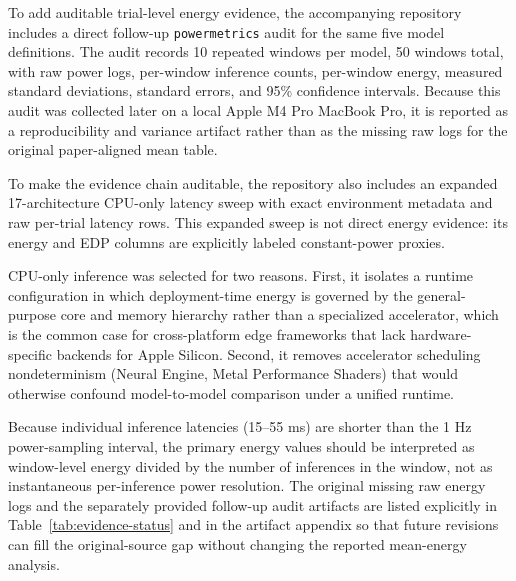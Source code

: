 \documentclass[conference]{IEEEtran}
\begin{document}
To add auditable trial-level energy evidence, the accompanying repository
includes a direct
follow-up \texttt{powermetrics} audit for the same five model definitions. The
audit records 10 repeated windows per model, 50 windows total, with raw power
logs, per-window inference counts, per-window energy, measured standard
deviations, standard errors, and 95\% confidence intervals. Because this audit
was collected later on a local Apple M4 Pro MacBook Pro, it is reported as a
reproducibility and variance artifact rather than as the missing raw logs for
the original paper-aligned mean table.

To make the evidence chain auditable, the repository also includes an expanded
17-architecture CPU-only latency sweep with exact environment metadata and raw
per-trial latency rows. This expanded sweep is not direct energy evidence:
its energy and EDP columns are explicitly labeled constant-power proxies.

CPU-only inference was selected for two reasons. First, it isolates a runtime
configuration in which deployment-time energy is governed by the general-purpose
core and memory hierarchy rather than a specialized accelerator, which is the
common case for cross-platform edge frameworks that lack hardware-specific
backends for Apple Silicon. Second, it removes accelerator scheduling
nondeterminism (Neural Engine, Metal Performance Shaders) that would otherwise
confound model-to-model comparison under a unified runtime.

Because individual inference latencies (15--55 ms) are shorter than the 1 Hz
power-sampling interval, the primary energy values should be interpreted as
window-level energy divided by the number of inferences in the window, not as
instantaneous per-inference power resolution. The original missing raw energy
logs and the separately provided follow-up audit artifacts are listed
explicitly in Table~\ref{tab:evidence-status} and in the artifact
appendix so that future revisions can fill the original-source gap without
changing the reported mean-energy analysis.
\end{document}
